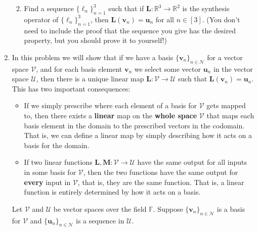 \documentclass[12pt]{amsart}
\newcommand{\1}{\mathbbm{1}}
\numberwithin{equation}{section}
\numberwithin{Theorem}{section}
\theoremstyle{plain} %
\theoremstyle{definition}
\theoremstyle{remark}
\begin{document}
\begin{enumerate}[1.]
\begin{enumerate}
\bigskip

\item Find a sequence \(\{\boldsymbol{\ell}_{n}\}_{n=1}^{3}\) such that if \(\mathbf{L}:\mathbb{R}^{3}\to\mathbb{R}^{2}\) is the synthesis operator of \(\{\boldsymbol{\ell}_{n}\}_{n=1}^{3}\), then \(\mathbf{L}(\mathbf{v}_{n}) = \mathbf{u}_{n}\) for all \(n\in[3]\). (You don't need to include the proof that the sequence you give has the desired property, but you should prove it to yourself!)

\bigskip

\end{enumerate}

\clearpage

\item In this problem we will show that if we have a basis \(\{\mathbf{v}_{n}\}_{n\in\mathcal{N}}\) for a vector space \(\mathcal{V}\), and for each basis element \(\mathbf{v}_{n}\) we select some vector \(\mathbf{u}_{n}\) in the vector space \(\mathcal{U}\), then there is a unique linear map \(\mathbf{L}:\mathcal{V}\to\mathcal{U}\) such that \(\mathbf{L}(\mathbf{v}_{n}) = \mathbf{u}_{n}\). This has two important consequences:

\begin{itemize}
\item If we simply prescribe where each element of a basis for \(\mathcal{V}\) gets mapped to, then there exists a \textbf{linear} map on the \textbf{whole space} \(\mathcal{V}\) that maps each basis element in the domain to the prescribed vectors in the codomain. That is, we can define a linear map by simply describing how it acts on a basis for the domain.

\item If two linear functions \(\mathbf{L},\mathbf{M}:\mathcal{V}\to\mathcal{U}\) have the same output for all inputs in some basis for \(\mathcal{V}\), then the two functions have the same output for \textbf{every} input in \(\mathcal{V}\), that is, they are the same function. That is, a linear function is entirely determined by how it acts on a basis.
\end{itemize}

Let \(\mathcal{V}\) and \(\mathcal{U}\) be vector spaces over the field \(\mathbb{F}\). Suppose \(\{\mathbf{v}_{n}\}_{n\in\mathcal{N}}\) is a basis for \(\mathcal{V}\) and \(\{\mathbf{u}_{n}\}_{n\in\mathcal{N}}\) is a sequence in \(\mathcal{U}\). 




\bigskip


\end{enumerate}
\end{document}
